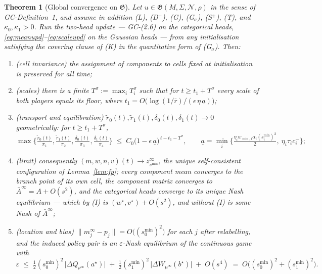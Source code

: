 \documentclass[11pt]{article}
\newtheorem{theorem}{Theorem}
\theoremstyle{definition}
\newcommand{\cN}{\mathcal{N}}
\newcommand{\GC}[1]{\textsf{GC-#1}}
\begin{document}
\begin{theorem}[Global convergence on $\mathfrak{G}$]\label{thm:main}
Let $u \in \mathfrak{G}(M,\Sigma,\cN,\rho)$ in the sense of \GC{Definition~1},
and assume in addition (L), (D$^+$), (G), (G$_\sigma$), (S$^+$), (T), and
$\kappa_0, \kappa_1 > 0$. Run the two-head update --- \GC{(2.6)} on the
categorical heads, \eqref{eq:meanupd}--\eqref{eq:scaleupd} on the Gaussian heads
--- from any initialisation satisfying the covering clause of (K) in the quantitative form of
(G$_\sigma$). Then:
\begin{enumerate}
\item[(a)] \emph{(cell invariance)} the assignment of components to cells fixed at
  initialisation is preserved for all time;
\item[(b)] \emph{(scales)} there is a finite $T^\sigma := \max_i T^\sigma_i$
  such that for $t \ge t_1 + T^\sigma$ every scale of both players equals its
  floor, where $t_1 = O\big(\log(1/\bar r)/(\epsilon\,\eta\,\underline a)\big)$;
\item[(c)] \emph{(transport and equilibration)} $\tilde r_0(t), \tilde r_1(t),
  \delta_0(t), \delta_1(t) \to 0$ geometrically: for $t \ge t_1 + T^\sigma$,
  \[
    \max\Big\{\tfrac{\tilde r_0(t)}{\pi_1}, \tfrac{\tilde r_1(t)}{\pi_2},
    \tfrac{\delta_0(t)}{\pi_3}, \tfrac{\delta_1(t)}{\pi_4}\Big\}
    \;\le\; C_0 \big(1 - \epsilon\,\underline a\big)^{\,t - t_1 - T^\sigma},
    \qquad
    \underline a = \min_i\Big\{\tfrac{\eta_i w_{\min,i}\alpha_i (s^{\min}_i)^2}{2},
    \ \eta_i\tau_i c^-_i\Big\};
  \]
\item[(d)] \emph{(limit)} consequently $(m,w,n,v)(t) \to z^\infty_{s^{\min}}$, the
  unique self-consistent configuration of Lemma~\ref{lem:fp}; every component mean
  converges to the branch point of its own cell, the component matrix converges to
  $\bar A^\infty = A + O(s^2)$, and the categorical heads converge to its unique
  Nash equilibrium --- which by (I) is $(w^\star, v^\star) + O(s^2)$, and without
  (I) is some Nash of $\bar A^\infty$;
\item[(e)] \emph{(location and bias)} $\|m^\infty_j - p_j\| =
  O\big((s^{\min}_0)^2\big)$ for each $j$ after relabelling, and the induced
  policy pair is an $\varepsilon$-Nash equilibrium of the continuous game with
  \[
    \varepsilon \;\le\; \tfrac12 (s^{\min}_0)^2\, \big|\Delta Q_{\nu^\infty}(a^\star)\big|
    \;+\; \tfrac12 (s^{\min}_1)^2\, \big|\Delta W_{\mu^\infty}(b^\star)\big|
    \;+\; O(s^4)
    \;=\; O\big((s^{\min}_0)^2 + (s^{\min}_1)^2\big).
  \]
\end{enumerate}
\end{theorem}
\end{document}
